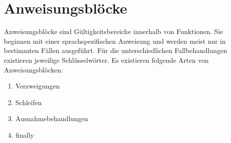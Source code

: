 \chapter{Anweisungsblöcke}
Anweisungsblöcke sind Gültigkeitsbereiche innerhalb von Funktionen. Sie beginnen mit einer sprachspezifischen Anweisung
und werden meist nur in bestimmten Fällen ausgeführt.
Für die unterschiedlichen Fallbehandlungen existieren jeweilige Schlüsselwörter.
Es existieren folgende Arten von Anweisungsblöcken:
\begin{enumerate}
\item Verzweigungen
\item Schleifen
\item Ausnahmebehandlungen
\item finally
\end{enumerate}